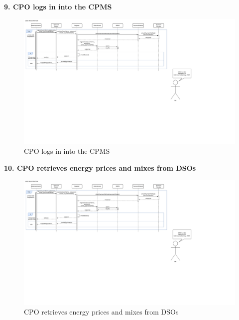 \documentclass[11pt]{article}
\begin{document}
\begin{description}
    \item \textbf{9. CPO logs in into the CPMS}
    \begin{figure}[!ht]
        \centering
        \includegraphics[page={9}, trim=0cm 20cm 25cm 1cmm, width=0.95\linewidth, clip]{RuntimeDiagrams.pdf}
        \caption{CPO logs in into the CPMS}
    \end{figure}
    
    \newpage
    
    \item \textbf{10. CPO retrieves energy prices and mixes from DSOs}
    \begin{figure}[!ht]
        \centering
        \includegraphics[page={10}, trim=0cm 17cm 25cm 1cmm, width=\linewidth, clip]{RuntimeDiagrams.pdf}
        \caption{CPO retrieves energy prices and mixes from DSOs}
    \end{figure}
    
    \newpage
    

\end{description}
\end{document}
